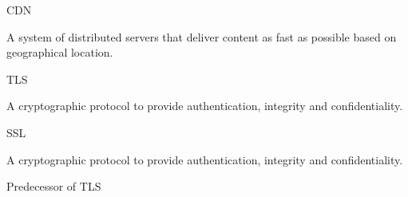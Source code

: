\documentclass[main.tex]{subfiles}
\begin{document}
\begin{card}{CDN}
\item A system of distributed servers that deliver content as fast as possible based on geographical location.
\end{card}

\begin{card}{TLS}
\item A cryptographic protocol to provide authentication, integrity and confidentiality.
\end{card}

\begin{card}{SSL}
\item A cryptographic protocol to provide authentication, integrity and confidentiality.
\item Predecessor of TLS
\end{card}



\end{document}
